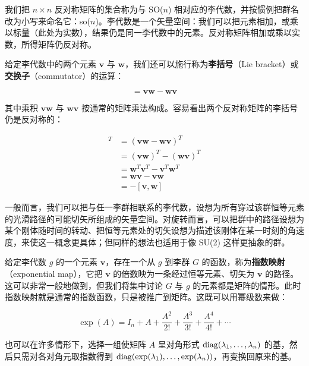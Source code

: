 我们把 $n\times n$ 反对称矩阵的集合称为与 SO($n$) 相对应的李代数，并按惯例把群名改为小写来命名它：so($n$)。李代数是一个矢量空间：我们可以把元素相加，或乘以标量（此处为实数），结果仍是同一李代数中的元素。反对称矩阵相加或乘以实数，所得矩阵仍反对称。

给定李代数中的两个元素 $\mathbf{v}$ 与 $\mathbf{w}$，我们还可以施行称为\textbf{李括号}（Lie bracket）或\textbf{交换子}（commutator）的运算：

\begin{equation}
[\mathbf{v},\mathbf{w}] = \mathbf{v}\mathbf{w} - \mathbf{w}\mathbf{v}
\end{equation}

其中乘积 $\mathbf{v}\mathbf{w}$ 与 $\mathbf{w}\mathbf{v}$ 按通常的矩阵乘法构成。容易看出两个反对称矩阵的李括号仍是反对称的：

\begin{align}
[\mathbf{v},\mathbf{w}]^{T} &= (\mathbf{v}\mathbf{w} - \mathbf{w}\mathbf{v})^{T} \\
&= (\mathbf{v}\mathbf{w})^{T} - (\mathbf{w}\mathbf{v})^{T} \\
&= \mathbf{w}^{T}\mathbf{v}^{T} - \mathbf{v}^{T}\mathbf{w}^{T} \\
&= \mathbf{w}\mathbf{v} - \mathbf{v}\mathbf{w} \\
&= -[\mathbf{v},\mathbf{w}]
\end{align}

一般而言，我们可以把与任一李群相联系的李代数，设想为所有穿过该群恒等元素的光滑路径的可能切矢所组成的矢量空间。对旋转而言，可以把群中的路径设想为某个刚体随时间的转动、把恒等元素处的切矢设想为描述该刚体在某一时刻的角速度，来使这一概念更具体；但同样的想法也适用于像 SU(2) 这样更抽象的群。

给定李代数 $g$ 的一个元素 $\mathbf{v}$，存在一个从 $g$ 到李群 $G$ 的函数，称为\textbf{指数映射}（exponential map），它把 $\mathbf{v}$ 的倍数映为一条经过恒等元素、切矢为 $\mathbf{v}$ 的路径。这可以非常一般地做到，但我们将集中讨论 $G$ 与 $g$ 的元素都是矩阵的情形。此时指数映射就是通常的指数函数，只是被推广到矩阵。这既可以用幂级数来做：

\begin{equation}
\exp(A) = I_n + A + \frac{A^{2}}{2!} + \frac{A^{3}}{3!} + \frac{A^{4}}{4!} + \cdots
\end{equation}

也可以在许多情形下，选择一组使矩阵 $A$ 呈对角形式 $\operatorname{diag}(\lambda_1,\dots,\lambda_n)$ 的基，然后只需对各对角元取指数得到 $\operatorname{diag}(\exp(\lambda_1),\dots,\exp(\lambda_n))$，再变换回原来的基。

